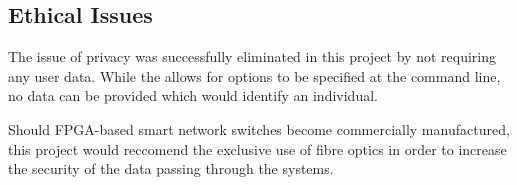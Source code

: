 
\subsection{Ethical Issues}
The issue of privacy was successfully eliminated in this project by not requiring any user data. While the allows for options to be specified at the command line, no data can be provided which would identify an individual.

Should FPGA-based smart network switches become commercially manufactured, this project would reccomend the exclusive use of fibre optics in order to increase the security of the data passing through the systems.
